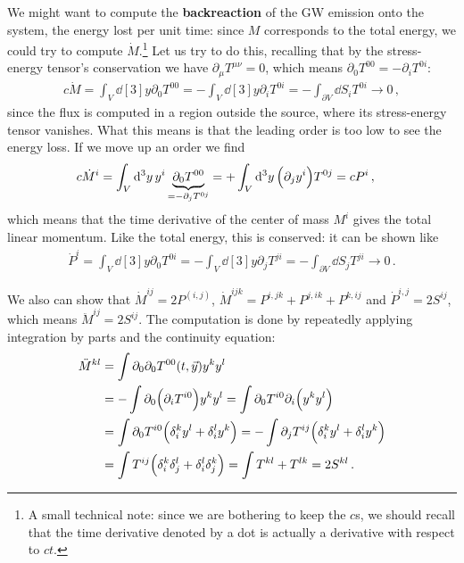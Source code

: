 \documentclass[main.tex]{subfiles}
\begin{document}
We might want to compute the \textbf{backreaction} of the GW emission onto the system, the energy lost per unit time: since \(M\) corresponds to the total energy, we could try to compute \(\dot{M}\).\footnote{A small technical note: since we are bothering to keep the \(c\)s, we should recall that the time derivative denoted by a dot is actually a derivative with respect to \(ct\).}
Let us try to do this, recalling that by the stress-energy tensor's conservation we have \(\partial_{\mu } T^{\mu \nu } = 0\), which means \(\partial_{0} T^{00} = - \partial_{i} T^{0i}\): 
%
\begin{align}
c\dot{M} = \int_{V} \dd[3]{y} \partial_{0} T^{00}
= - \int_{V} \dd[3]{y} \partial_{i} T^{0i}
= - \int_{\partial V} \dd{S}_i T^{0i} \to 0
\,,
\end{align}
%
since the flux is computed in a region outside the source, where its stress-energy tensor vanishes. 
What this means is that the leading order is too low to see the energy loss. 
If we move up an order we find 
%
\begin{align}
c \dot{M}^{i} &= \int_{V} \dd[3]{y} y^{i} \underbrace{\partial_{0} T^{00}}_{= - \partial_{j} T^{0j}}
= + \int_{V} \dd[3]{y} \qty(\partial_{j} y^{i}) T^{0j} = cP^{i}
\,,
\end{align}
%
which means that the time derivative of the center of mass \(M^{i}\) gives the total linear momentum.
Like the total energy, this is conserved: it can be shown like 
%
\begin{align}
\dot{P}^{i} = \int_V \dd[3]{y} \partial_{0} T^{0i} = -\int_V \dd[3]{y} \partial_{j} T^{ji} = - \int_{\partial V} \dd{S_j} T^{ji}  \to 0 
\,.
\end{align}

We also can show that \(\dot{M}^{ij} = 2 P^{(i, j)}\), \(\dot{M}^{ijk} = P^{i,jk} + P^{j, ik} + P^{k, ij}\) and \(\dot{P}^{i,j} = 2 S^{ij}\), which means \(\ddot{M}^{ij} = 2 S^{ij}\).
The computation is done by repeatedly applying integration by parts and the continuity equation: 
%
\begin{align}
\ddot{M}^{kl} &= \int \partial_0 \partial_0 T^{00}(t, \vec{y}) y^{k}y^{l}  \\
&= - \int \partial_0 \qty(\partial_{i} T^{i0}) y^{k}y^{l}  
= \int \partial_0 T^{i0} \partial_{i} \qty(y^{k}y^{l})  \\
&= \int \partial_0 T^{i0} \qty(\delta_i^k y^{l} + \delta_{i}^{l} y^{k})  
= -\int \partial_{j} T^{ij} \qty(\delta_i^k y^{l} + \delta_{i}^{l} y^{k})  \\
&= \int T^{ij} \qty(\delta_{i}^{k} \delta^{l}_{j} + \delta_{i}^{l} \delta^{k}_{j})
= \int T^{kl} + T^{lk} = 2 S^{kl}
\,.
\end{align}
\end{document}
